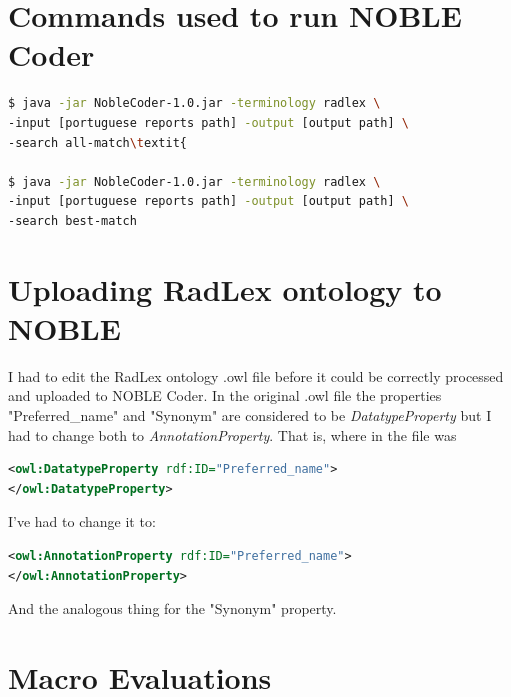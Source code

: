 \label{appendices}

\chapter{Commands used to run NOBLE Coder}
\label{app:commands_run_noble}

\begin{lstlisting}[language=bash]
$ java -jar NobleCoder-1.0.jar -terminology radlex \
-input [portuguese reports path] -output [output path] \
-search all-match\textit{

$ java -jar NobleCoder-1.0.jar -terminology radlex \
-input [portuguese reports path] -output [output path] \
-search best-match
\end{lstlisting}

\chapter{Uploading RadLex ontology to NOBLE}
\label{app:change_radlex_noble}

I had to edit the RadLex ontology .owl file before it could be correctly processed and uploaded to NOBLE Coder. In the original .owl file the properties  "Preferred\_name" and "Synonym" are considered to be \textit{DatatypeProperty} but I had to change both to \textit{AnnotationProperty}. That is, where in the file was

\begin{lstlisting}[language=xml]
<owl:DatatypeProperty rdf:ID="Preferred_name">
</owl:DatatypeProperty>
\end{lstlisting}

I've had to change it to:

\begin{lstlisting}[language=xml]
<owl:AnnotationProperty rdf:ID="Preferred_name">
</owl:AnnotationProperty>
\end{lstlisting}

And the analogous thing for the "Synonym" property.


\chapter{Macro Evaluations}
\label{app:macro_evaluations}

